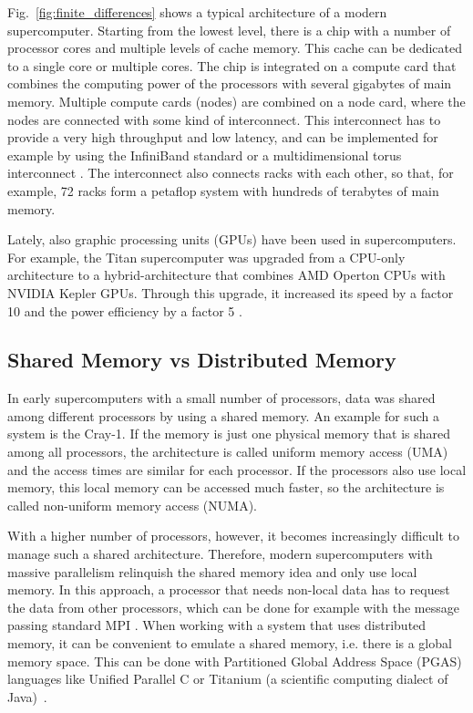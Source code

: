 Fig.~\ref{fig:finite_differences} shows a typical architecture of a modern supercomputer. Starting from the lowest level, there is a chip with a number of processor cores and multiple levels of cache memory. This cache can be dedicated to a single core or multiple cores. The chip is integrated on a compute card that combines the computing power of the processors with several gigabytes of main memory. Multiple compute cards (nodes) are combined on a node card, where the nodes are connected with some kind of interconnect. This interconnect has to provide a very high throughput and low latency, and can be implemented for example by using the InfiniBand standard \cite{liu2004high} or a multidimensional torus interconnect \cite{adiga2002overview}. The interconnect also connects racks with each other, so that, for example, 72 racks form a petaflop system with hundreds of terabytes of main memory.



Lately, also graphic processing units (GPUs) have been used in supercomputers. For example, the Titan supercomputer was upgraded from a CPU-only architecture to a hybrid-architecture that combines AMD Operton CPUs with NVIDIA Kepler GPUs. Through this upgrade, it increased its speed by a factor 10 and the power efficiency by a factor 5 \cite{titan}.


\subsection{Shared Memory vs Distributed Memory}

In early supercomputers with a small number of processors, data was shared among different processors by using a shared memory. An example for such a system is the Cray-1. If the memory is just one physical memory that is shared among all processors, the architecture is called uniform memory access (UMA) and the access times are similar for each processor. If the processors also use local memory, this local memory can be accessed much faster, so the architecture is called non-uniform memory access (NUMA). 

With a higher number of processors, however, it becomes increasingly difficult to manage such a shared architecture. Therefore, modern supercomputers with massive parallelism relinquish the shared memory idea and only use local memory. In this approach, a processor that needs non-local data has to request the data from other processors, which can be done for example with the message passing standard MPI \cite{mpi_forum}. When working with a system that uses distributed memory, it can be convenient to emulate a shared memory, i.e. there is a global memory space. This can be done with Partitioned Global Address Space (PGAS) languages like Unified Parallel C or Titanium (a scientific computing dialect of Java)~\cite{Yelick:2007:PPU:1278177.1278183}.


